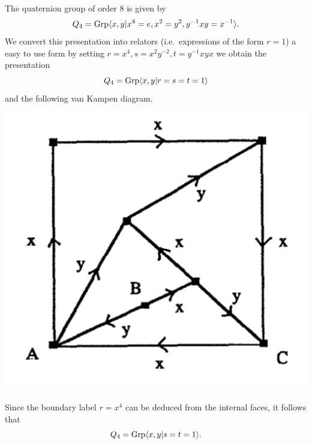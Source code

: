 \begin{eg} The quaternion group of order 8 is given by \[Q_4 = \mathrm{Grp}\langle x,y|x^4=e,
    x^2 = y^2, y^{-1} x y = x^{-1}\rangle.\] We convert this presentation into
    relators (i.e.~expressions of the form $r=1$) a easy to use form by setting
    $r = x^4, s = x^2y^{-2}, t = y^{-1}xyx$ we obtain the presentation
    \[Q_4 = \mathrm{Grp}\langle x,y|r = s = t = 1\rangle\]
    and the following van Kampen diagram.
\begin{center}
    \includegraphics[scale=0.3]{resources/vanKampenDiagram.pdf}
\end{center} Since the boundary label $r = x^4$ can be deduced from the
    internal faces, it follows that \[Q_4 = \mathrm{Grp}\langle x,y|s=t=1\rangle.\]
\end{eg}

